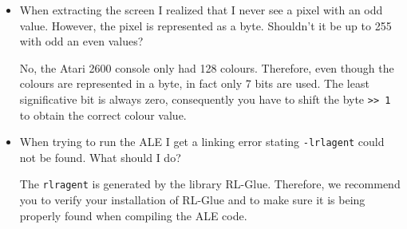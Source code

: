 \documentclass[12pt]{article}
\begin{document}
\begin{itemize}
\item When extracting the screen I realized that I never see a pixel with an odd value. However,
the pixel is represented as a byte. Shouldn't it be up to 255 with odd an even values?

No, the Atari 2600 console only had 128 colours. Therefore, even though the colours are represented 
in a byte, in fact only 7 bits are used. The least significative bit is always zero, consequently you have
to shift the byte \verb+>> 1+ to obtain the correct colour value.

\item When trying to run the ALE I get a linking error stating \verb+-lrlagent+ could not be found.  
What should I do?

The \verb+rlragent+ is generated by the library RL-Glue. Therefore, we recommend you to verify your 
installation of RL-Glue and to make sure it is being properly found when compiling the ALE code.

\end{itemize}
\end{document}
